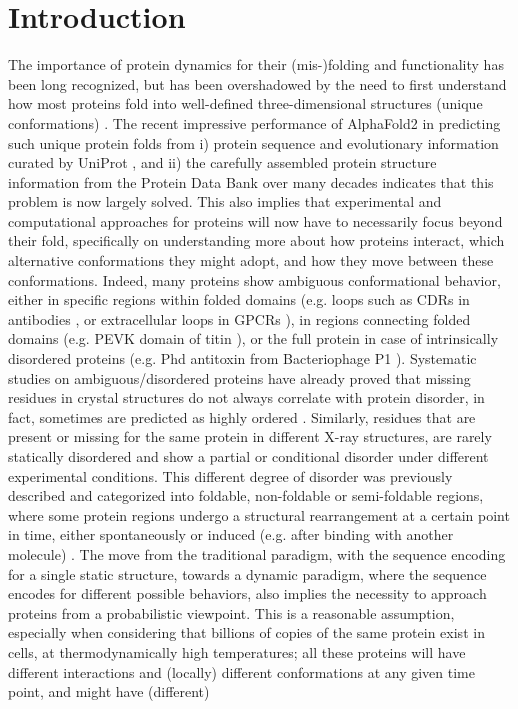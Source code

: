 \section{Introduction}

The importance of protein dynamics for their (mis-)folding \cite{daggett_is_2003, dobson_protein_2003} and functionality \cite{karplus_molecular_2005, glazer_improving_2009} has been long recognized, but has been overshadowed by the need to first understand how most proteins fold into well-defined three-dimensional structures (unique conformations) \cite{hunkapiller_contemporary_1984, berman_worldwide_2007}. The recent impressive performance of AlphaFold2 \cite{jumper_highly_2021} in predicting such unique protein folds from i) protein sequence and evolutionary information curated by UniProt \cite{the_uniprot_consortium_uniprot_2021}, and ii) the carefully assembled protein structure information from the Protein Data Bank over many decades \cite{berman_worldwide_2007} indicates that this problem is now largely solved. This also implies that experimental and computational approaches for proteins will now have to necessarily focus beyond their fold, specifically on understanding more about how proteins interact, which alternative conformations they might adopt, and how they move between these conformations. Indeed, many proteins show ambiguous conformational behavior, either in specific regions within folded domains (e.g. loops such as CDRs in antibodies \cite{armstrong_conformational_2008}, or extracellular loops in GPCRs \cite{hilger_structure_2018}), in regions connecting folded domains (e.g. PEVK domain of titin \cite{hsin_molecular_2011}), or the full protein in case of intrinsically disordered proteins (e.g. Phd antitoxin from Bacteriophage P1 \cite{de_gieter_intrinsically_2014}). Systematic studies on ambiguous/disordered proteins have already proved that missing residues in crystal structures do not always correlate with protein disorder, in fact, sometimes are predicted as highly ordered \cite{gall_intrinsic_2007}. Similarly, residues that are present or missing for the same protein in different X-ray structures, are rarely statically disordered and show a partial or conditional disorder under different experimental conditions. This different degree of disorder was previously described and categorized into foldable, non-foldable or semi-foldable regions, where some protein regions undergo a structural rearrangement at a certain point in time, either spontaneously or induced (e.g. after binding with another molecule) \cite{uversky_unusual_2013}. The move from the traditional paradigm, with the sequence encoding for a single static structure, towards a dynamic paradigm, where the sequence encodes for different possible behaviors, also implies the necessity to approach proteins from a probabilistic viewpoint. This is a reasonable assumption, especially when considering that billions of copies of the same protein exist in cells, at thermodynamically high temperatures; all these proteins will have different interactions and (locally) different conformations at any given time point, and might have (different) 